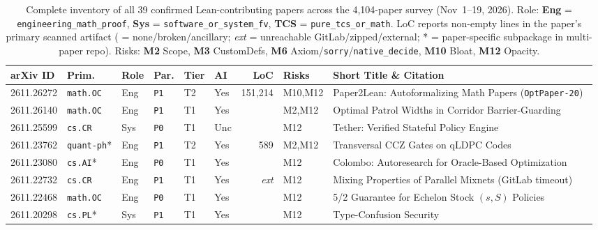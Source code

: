 \documentclass[11pt,letterpaper]{article}
\begin{document}
\begin{table}[p]
\centering
\caption{Complete inventory of all 39 confirmed Lean-contributing papers across the 4,104-paper survey (Nov~1--19, 2026). Role: \textbf{Eng} = \texttt{engineering\_math\_proof}, \textbf{Sys} = \texttt{software\_or\_system\_fv}, \textbf{TCS} = \texttt{pure\_tcs\_or\_math}. LoC reports non-empty lines in the paper's primary scanned artifact (\textemdash{} = none/broken/ancillary; \emph{ext} = unreachable GitLab/zipped/external; * = paper-specific subpackage in multi-paper repo). Risks: \textbf{M2} Scope, \textbf{M3} CustomDefs, \textbf{M6} Axiom/\texttt{sorry}/\texttt{native\_decide}, \textbf{M10} Bloat, \textbf{M12} Opacity.}
\label{tab:inventory}
\tiny
\setlength{\tabcolsep}{2.3pt}
\begin{tabularx}{\textwidth}{llllllrlX}
\toprule
\textbf{arXiv ID} & \textbf{Prim.} & \textbf{Role} & \textbf{Par.} & \textbf{Tier} & \textbf{AI} & \textbf{LoC} & \textbf{Risks} & \textbf{Short Title \& Citation} \\
\midrule
2611.26272 & \texttt{math.OC} & Eng & \texttt{P1} & T2 & Yes & 151,214 & M10,M12 & Paper2Lean: Autoformalizing Math Papers (\texttt{OptPaper-20})~\cite{arxiv2611_26272} \\
2611.26140 & \texttt{math.OC} & Eng & \texttt{P1} & T1 & Yes & \textemdash{} & M2,M12 & Optimal Patrol Widths in Corridor Barrier-Guarding~\cite{arxiv2611_26140} \\
2611.25599 & \texttt{cs.CR} & Sys & \texttt{P0} & T1 & Unc & \textemdash{} & M12 & Tether: Verified Stateful Policy Engine~\cite{arxiv2611_25599} \\
2611.23762 & \texttt{quant-ph}* & Eng & \texttt{P1} & T2 & Yes & 589 & M2,M12 & Transversal CCZ Gates on qLDPC Codes~\cite{arxiv2611_23762} \\
2611.23080 & \texttt{cs.AI}* & Eng & \texttt{P0} & T1 & Yes & \textemdash{} & M12 & Colombo: Autoresearch for Oracle-Based Optimization~\cite{arxiv2611_23080} \\
2611.22732 & \texttt{cs.CR} & Eng & \texttt{P1} & T1 & Yes & \emph{ext} & M12 & Mixing Properties of Parallel Mixnets (GitLab timeout)~\cite{arxiv2611_22732} \\
2611.22468 & \texttt{math.OC} & Eng & \texttt{P0} & T1 & Yes & \textemdash{} & M12 & 5/2 Guarantee for Echelon Stock $(s,S)$ Policies~\cite{arxiv2611_22468} \\
2611.20298 & \texttt{cs.PL}* & Sys & \texttt{P1} & T1 & Yes & \textemdash{} & M12 & Type-Confusion Security~\cite{arxiv2611_20298} \\

\end{tabularx}
\end{table}
\end{document}
